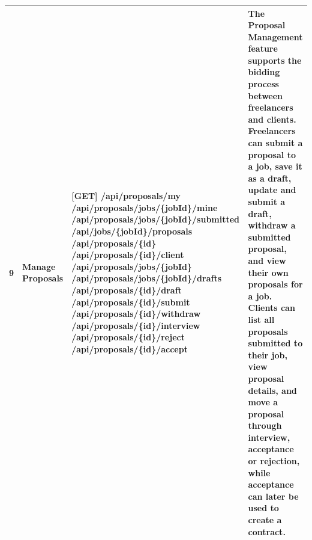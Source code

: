 \begin{longtable}{|C{0.7cm}|L{2.6cm}|S{6.6cm}|L{5.2cm}|}
9
&
\textbf{Manage Proposals}
&
[GET] /\allowbreak{}api/\allowbreak{}proposals/\allowbreak{}my \newline
[GET] /\allowbreak{}api/\allowbreak{}proposals/\allowbreak{}jobs/\allowbreak{}\{jobId\}/\allowbreak{}mine \newline
[GET] /\allowbreak{}api/\allowbreak{}proposals/\allowbreak{}jobs/\allowbreak{}\{jobId\}/\allowbreak{}submitted \newline
[GET] /\allowbreak{}api/\allowbreak{}jobs/\allowbreak{}\{jobId\}/\allowbreak{}proposals \newline
[GET] /\allowbreak{}api/\allowbreak{}proposals/\allowbreak{}\{id\} \newline
[GET] /\allowbreak{}api/\allowbreak{}proposals/\allowbreak{}\{id\}/\allowbreak{}client \newline
[POST] /\allowbreak{}api/\allowbreak{}proposals/\allowbreak{}jobs/\allowbreak{}\{jobId\} \newline
[POST] /\allowbreak{}api/\allowbreak{}proposals/\allowbreak{}jobs/\allowbreak{}\{jobId\}/\allowbreak{}drafts \newline
[PATCH] /\allowbreak{}api/\allowbreak{}proposals/\allowbreak{}\{id\}/\allowbreak{}draft \newline
[PATCH] /\allowbreak{}api/\allowbreak{}proposals/\allowbreak{}\{id\}/\allowbreak{}submit \newline
[PATCH] /\allowbreak{}api/\allowbreak{}proposals/\allowbreak{}\{id\}/\allowbreak{}withdraw \newline
[PATCH] /\allowbreak{}api/\allowbreak{}proposals/\allowbreak{}\{id\}/\allowbreak{}interview \newline
[PATCH] /\allowbreak{}api/\allowbreak{}proposals/\allowbreak{}\{id\}/\allowbreak{}reject \newline
[PATCH] /\allowbreak{}api/\allowbreak{}proposals/\allowbreak{}\{id\}/\allowbreak{}accept
&
The Proposal Management feature supports the bidding process between freelancers and clients. Freelancers can submit a proposal to a job, save it as a draft, update and submit a draft, withdraw a submitted proposal, and view their own proposals for a job. Clients can list all proposals submitted to their job, view proposal details, and move a proposal through interview, acceptance or rejection, while acceptance can later be used to create a contract.
\\ \hline


\end{longtable}
